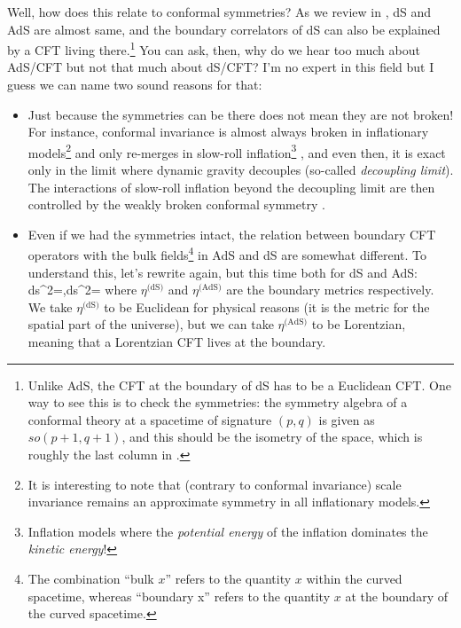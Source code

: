 \documentclass[12pt]{article}
\numberwithin{equation}{section}
\begin{document}
Well, how does this relate to conformal symmetries? As we review in \tabref{\ref{table: comparison of spaces of maximal symmetry}}, dS and AdS are almost same, and the boundary correlators of dS can also be explained by a CFT living there.\footnote{Unlike AdS, the CFT at the boundary of dS has to be a Euclidean CFT. One way to see this is to check the symmetries: the symmetry algebra of a conformal theory at a spacetime of signature $(p,q)$ is given as $so(p+1,q+1)$, and this should be the isometry of the space, which is roughly the last column in \tabref{\ref{table: comparison of spaces of maximal symmetry}}.} You can ask, then, why do we hear too much about AdS/CFT but not that much about dS/CFT? I'm no expert in this field but I guess we can name two sound reasons for that:
\begin{itemize}
	\item Just because the symmetries can be there does not mean they are not broken! For instance, conformal invariance is almost always broken in inflationary models\footnote{It is interesting to note that (contrary to conformal invariance) scale invariance remains an approximate symmetry in all inflationary models.} and only re-merges in slow-roll inflation\footnote{Inflation models where the \emph{potential energy} of the inflation dominates the \emph{kinetic energy}!} \cite{Baumann:2019ghk}, and even then, it is exact only in the limit where dynamic gravity decouples (so-called \emph{decoupling limit}). The interactions of slow-roll inflation beyond the decoupling limit are then controlled by the weakly broken conformal symmetry \cite{Arkani-Hamed:2015bza,Arkani-Hamed:2018kmz,Mata:2012bx}.
	
	\item Even if we had the symmetries intact, the relation between boundary CFT operators with the bulk fields\footnote{The combination ``bulk $x$'' refers to the quantity $x$ within the curved spacetime, whereas ``boundary x'' refers to the quantity $x$ at the boundary of the curved spacetime.} in AdS and dS are somewhat different. To understand this, let's rewrite  again, but this time both for dS and AdS:
	\be
	ds^2=\quad{}\;,\qquad ds^2=\quad{}
	\ee 
where $\eta^{\text{(dS)}}$ and $\eta^{\text{(AdS)}}$ are the boundary metrics respectively. We take $\eta^{\text{(dS)}}$ to be Euclidean for physical reasons (it is the metric for the spatial part of the universe), but we can take $\eta^{\text{(AdS)}}$ to be Lorentzian, meaning that a Lorentzian CFT lives at the boundary.
				

\end{itemize}
\end{document}
